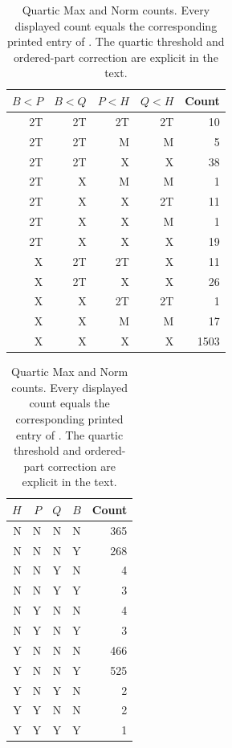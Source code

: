 \begin{table}[p]
\centering
\begin{minipage}[t]{.55\textwidth}
\centering
\begin{tabular}{rrrrr}
\toprule
$B<P$ & $B<Q$ & $P<H$ & $Q<H$ & Count\\
\midrule
2T & 2T & 2T & 2T & 10\\
2T & 2T & M & M & 5\\
2T & 2T & X & X & 38\\
2T & X & M & M & 1\\
2T & X & X & 2T & 11\\
2T & X & X & M & 1\\
2T & X & X & X & 19\\
X & 2T & 2T & X & 11\\
X & 2T & X & X & 26\\
X & X & 2T & 2T & 1\\
X & X & M & M & 17\\
X & X & X & X & 1503\\
\bottomrule
\end{tabular}
\end{minipage}\hfill
\begin{minipage}[t]{.41\textwidth}
\centering
\begin{tabular}{rrrrr}
\toprule
$H$ & $P$ & $Q$ & $B$ & Count\\
\midrule
N & N & N & N & 365\\
N & N & N & Y & 268\\
N & N & Y & N & 4\\
N & N & Y & Y & 3\\
N & Y & N & N & 4\\
N & Y & N & Y & 3\\
Y & N & N & N & 466\\
Y & N & N & Y & 525\\
Y & N & Y & N & 2\\
Y & Y & N & N & 2\\
Y & Y & Y & Y & 1\\
\bottomrule
\end{tabular}
\end{minipage}
\caption{Quartic Max and Norm counts.  Every displayed count equals the corresponding printed entry of \cite{L059}.  The quartic threshold and ordered-part correction are explicit in the text.}
\end{table}
